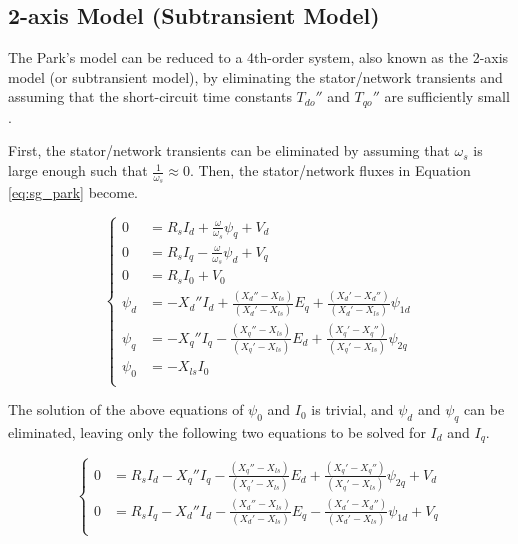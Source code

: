 \subsection{2-axis Model (Subtransient Model)}

The Park's model can be reduced to a 4th-order system, also known as the 2-axis
model (or subtransient model), by eliminating the stator/network transients and 
assuming that the short-circuit time constants $T_{do}''$ and $T_{qo}''$ are
sufficiently small \cite{sauer2017power}.

First, the stator/network transients can be eliminated by assuming that
$\omega_s$ is large enough such that $\frac{1}{\omega_s} \approx 0$. Then, the
stator/network fluxes in Equation \ref{eq:sg_park} become.

\begin{equation*}
    \begin{cases}
        0 &= R_s I_d + \frac{\omega}{\omega_s}\psi_q + V_d\\
        0 &= R_s I_q - \frac{\omega}{\omega_s}\psi_d + V_q\\
        0 &= R_s I_0 + V_0\\
        \psi_d &= -X_d'' I_d + \frac{(X_d'' - X_{ls})}{(X_d' - X_{ls})} E_q + \frac{(X_d' - X_d'')}{(X_d' - X_{ls})}\psi_{1d}\\
        \psi_q &= -X_q'' I_q - \frac{(X_q'' - X_{ls})}{(X_q' - X_{ls})} E_d + \frac{(X_q' - X_q'')}{(X_q' - X_{ls})}\psi_{2q}\\
        \psi_0 &= -X_{ls} I_0\\
    \end{cases}
\end{equation*}

The solution of the above equations of $\psi_0$ and $I_0$ is trivial, and
$\psi_d$ and $\psi_q$ can be eliminated, leaving only the following two
equations to be solved for $I_d$ and $I_q$.

\begin{equation}\label{eq:for_I_2axis}
    \begin{cases}
        0 &= R_s I_d - X_q'' I_q - \frac{(X_q'' - X_{ls})}{(X_q' - X_{ls})} E_d + \frac{(X_q' - X_q'')}{(X_q' - X_{ls})}\psi_{2q} + V_d \\
        0 &= R_s I_q - X_d'' I_d - \frac{(X_d'' - X_{ls})}{(X_d' - X_{ls})} E_q - \frac{(X_d' - X_d'')}{(X_d' - X_{ls})}\psi_{1d} + V_q \\
    \end{cases}
\end{equation}

